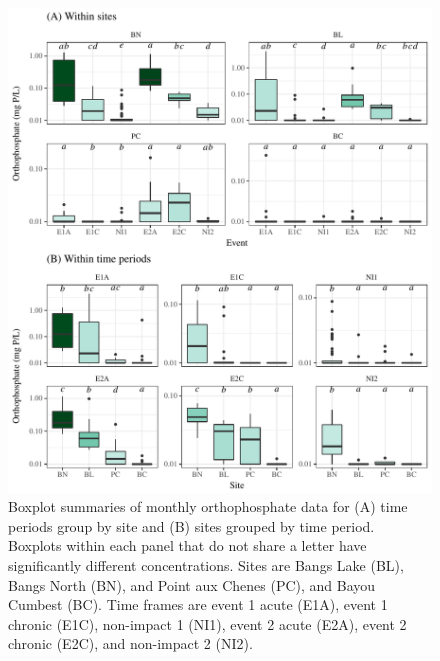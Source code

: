 \documentclass[letterpaper,12pt]{article}\usepackage[]{graphicx}\usepackage[]{color}
\makeatletter
\def\maxwidth{ %
  \ifdim\Gin@nat@width>\linewidth
    \linewidth
  \else
    \Gin@nat@width
  \fi
}
\makeatother
\begin{document}
\begin{figure}[!ht]

{\centering \includegraphics[width=\maxwidth]{figs/Fig6} 

}

\caption[Boxplot summaries of monthly orthophosphate data for (A) time periods group by site and (B) sites grouped by time period]{Boxplot summaries of monthly orthophosphate data for (A) time periods group by site and (B) sites grouped by time period. Boxplots within each panel that do not share a letter have significantly different concentrations. Sites are Bangs Lake (BL), Bangs North (BN), and Point aux Chenes (PC), and Bayou Cumbest (BC).  Time frames are event 1 acute (E1A), event 1 chronic (E1C), non-impact 1 (NI1), event 2 acute (E2A), event 2 chronic (E2C), and non-impact 2 (NI2).}\label{fig:Fig6}
\end{figure}



\clearpage

\end{document}
